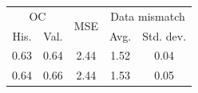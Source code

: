 \begin{tabular}{ccccc}
\toprule
\multicolumn{2}{c}{OC} & 
\multirow{2}{*}{
    MSE
} & 
\multicolumn{2}{c}{Data mismatch} 
\\
His. & Val. &  & Avg. & Std. dev.
\\
\midrule
0.63 & 0.64 & 2.44 & 1.52 & 0.04 \\
0.64 & 0.66 & 2.44 & 1.53 & 0.05 \\
\bottomrule
\end{tabular}
